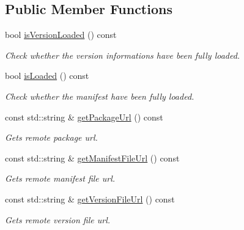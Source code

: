 \subsection*{Public Member Functions}
\begin{DoxyCompactItemize}
\item 
\mbox{\label{classManifest_ac60866081038f8f1ca9fdaf22be2005f}} 
bool \hyperlink{classManifest_ac60866081038f8f1ca9fdaf22be2005f}{is\+Version\+Loaded} () const
\begin{DoxyCompactList}\small\item\em Check whether the version informations have been fully loaded. \end{DoxyCompactList}\item 
\mbox{\label{classManifest_a8823e53da0e74218358be708268e0f6d}} 
bool \hyperlink{classManifest_a8823e53da0e74218358be708268e0f6d}{is\+Loaded} () const
\begin{DoxyCompactList}\small\item\em Check whether the manifest have been fully loaded. \end{DoxyCompactList}\item 
\mbox{\label{classManifest_a184cbf00cdf022dcfd1e6569c7e550ff}} 
const std\+::string \& \hyperlink{classManifest_a184cbf00cdf022dcfd1e6569c7e550ff}{get\+Package\+Url} () const
\begin{DoxyCompactList}\small\item\em Gets remote package url. \end{DoxyCompactList}\item 
\mbox{\label{classManifest_a05202afe0eaa5902c426d4cfbb1827c1}} 
const std\+::string \& \hyperlink{classManifest_a05202afe0eaa5902c426d4cfbb1827c1}{get\+Manifest\+File\+Url} () const
\begin{DoxyCompactList}\small\item\em Gets remote manifest file url. \end{DoxyCompactList}\item 
\mbox{\label{classManifest_acfa059d0d3e2f8ff283e50acd862d044}} 
const std\+::string \& \hyperlink{classManifest_acfa059d0d3e2f8ff283e50acd862d044}{get\+Version\+File\+Url} () const
\begin{DoxyCompactList}\small\item\em Gets remote version file url. \end{DoxyCompactList}\item 

\end{DoxyCompactItemize}
